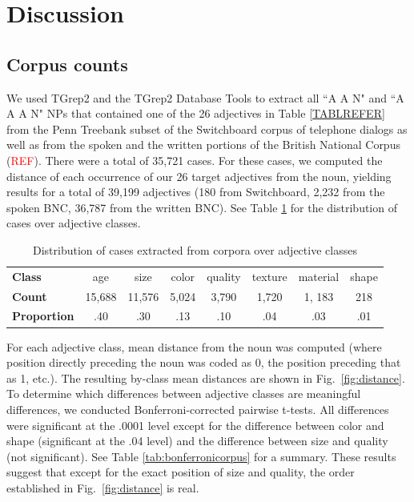 \documentclass{pnastwo}
\newcommand{\tableref}[1]{Table \ref{#1}}
\newcommand{\figref}[1]{Fig.~\ref{#1}}
\newcommand{\red}[1]{\textcolor{Red}{#1}}
\begin{document}
\begin{article}
\section{Discussion}



\begin{materials}
\section{Corpus counts} 

We used TGrep2 \cite{rohde2005} and the TGrep2 Database Tools \cite{degenjaeger-tdt} to extract all ``A A N" and ``A A A N" NPs that contained one of the 26 adjectives in Table \ref{TABLREFER} from the Penn Treebank subset of the Switchboard corpus of telephone dialogs \cite{godfrey1992} as well as from the spoken and the written portions of the British National Corpus (\red{REF}). There were a total of 35,721 cases. For these cases, we computed the distance of each occurrence of our 26 target adjectives from the noun, yielding results for a total of 39,199 adjectives (180 from Switchboard, 2,232 from the spoken BNC, 36,787 from the written BNC).  See \tableref{tab:adjdist} for the distribution of cases over adjective classes.

\begin{table}
	\caption{Distribution of cases extracted from corpora over adjective classes}
	\begin{tabular}{l c c c c c c c}
	\textbf{Class} & age & size & color & quality & texture & material & shape \\
	\textbf{Count} & 15,688 & 11,576 & 5,024 & 3,790 & 1,720 & 1, 183 & 218 \\
	\textbf{Proportion} & .40 & .30 & .13 & .10 & .04 & .03 & .01
	\end{tabular}
\label{tab:adjdist}
\end{table}


For each adjective class, mean distance from the noun was computed (where position directly preceding the noun was coded as 0, the position preceding that as 1, etc.). The resulting by-class mean distances are shown in \figref{fig:distance}. To determine which differences between adjective classes are meaningful differences, we conducted Bonferroni-corrected pairwise t-tests. All differences were significant at the .0001 level except for the difference between color and shape (significant at the .04 level) and the difference between size and quality (not significant). See \tableref{tab:bonferronicorpus} for a summary. These results suggest that except for the exact position of size and quality, the order established in \figref{fig:distance} is real.


\end{materials}
\end{article}
\end{document}
